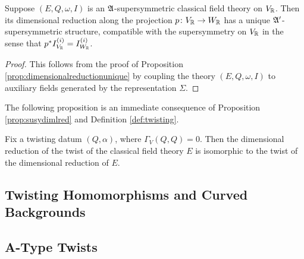 \documentclass[10pt, oneside]{article}
\begin{document}
\begin{prop} \label{prop:susydimlred}
Suppose $(E, Q, \omega, I)$ is an $\mathfrak{A}$-supersymmetric classical field theory on $V_\mathbb R$. Then its dimensional reduction along the projection $p\colon V_\mathbb R\rightarrow W_\mathbb R$ has a unique $\mathfrak{A}'$-supersymmetric structure, compatible with the supersymmetry on $V_\mathbb R$ in the sense that $p^*I^{(i)}_{V_\mathbb R} = I^{(i)}_{W_\mathbb R}$.
\end{prop}

\begin{proof}
This follows from the proof of Proposition \ref{prop:dimensionalreductionunique} by coupling the theory $(E, Q, \omega, I)$ to auxiliary fields generated by the representation $\Sigma$.
\end{proof}

The following proposition is an immediate consequence of Proposition \ref{prop:susydimlred} and Definition \ref{def:twisting}.

\begin{prop}
Fix a twisting datum $(Q, \alpha)$, where $\Gamma_V(Q, Q) = 0$. Then the dimensional reduction of the twist of the classical field theory $E$ is isomorphic to the twist of the dimensional reduction of $E$.
\label{prop:twistdimensionalreduction}
\end{prop}

\subsection{Twisting Homomorphisms and Curved Backgrounds}

\subsection{A-Type Twists} \label{A_twist_section}
\end{document}
